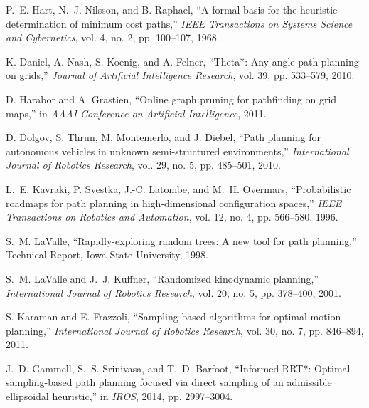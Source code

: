 \documentclass[12pt,a4paper,oneside]{book}
\begin{document}
\begin{enumerate}[label={[\arabic*]}, leftmargin=*]
\item \label{Hart1968} P.~E. Hart, N.~J. Nilsson, and B. Raphael, ``A formal basis for the heuristic determination of minimum cost paths,'' \emph{IEEE Transactions on Systems Science and Cybernetics}, vol. 4, no. 2, pp. 100--107, 1968.

\item \label{Daniel2010} K. Daniel, A. Nash, S. Koenig, and A. Felner, ``Theta*: Any-angle path planning on grids,'' \emph{Journal of Artificial Intelligence Research}, vol. 39, pp. 533--579, 2010.

\item \label{Harabor2011} D. Harabor and A. Grastien, ``Online graph pruning for pathfinding on grid maps,'' in \emph{AAAI Conference on Artificial Intelligence}, 2011.

\item \label{Dolgov2010} D. Dolgov, S. Thrun, M. Montemerlo, and J. Diebel, ``Path planning for autonomous vehicles in unknown semi-structured environments,'' \emph{International Journal of Robotics Research}, vol. 29, no. 5, pp. 485--501, 2010.

\item \label{Kavraki1996} L.~E. Kavraki, P. Svestka, J.-C. Latombe, and M.~H. Overmars, ``Probabilistic roadmaps for path planning in high-dimensional configuration spaces,'' \emph{IEEE Transactions on Robotics and Automation}, vol. 12, no. 4, pp. 566--580, 1996.

\item \label{LaValle1998} S.~M. LaValle, ``Rapidly-exploring random trees: A new tool for path planning,'' Technical Report, Iowa State University, 1998.

\item \label{LaValle2001} S.~M. LaValle and J.~J. Kuffner, ``Randomized kinodynamic planning,'' \emph{International Journal of Robotics Research}, vol. 20, no. 5, pp. 378--400, 2001.

\item \label{Karaman2011} S. Karaman and E. Frazzoli, ``Sampling-based algorithms for optimal motion planning,'' \emph{International Journal of Robotics Research}, vol. 30, no. 7, pp. 846--894, 2011.

\item \label{Gammell2014} J.~D. Gammell, S.~S. Srinivasa, and T.~D. Barfoot, ``Informed RRT*: Optimal sampling-based path planning focused via direct sampling of an admissible ellipsoidal heuristic,'' in \emph{IROS}, 2014, pp. 2997--3004.


\end{enumerate}
\end{document}
